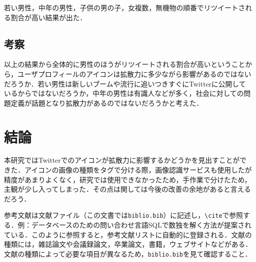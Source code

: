 若い男性，中年の男性，子供の男の子，女複数，無機物の順番でリツイートされる割合が高い結果が出た．

\section{考察}

以上の結果から全体的に男性のほうがリツイートされる割合が高いということから，ユーザプロフィールのアイコンは拡散力に多少ながら影響があるのではないだろうか．若い男性は新しいブームや流行に追いつきすぐにTwitterに公開しているからではないだろうか，中年の男性は有識人などが多く，社会に対しての問題定義が話題となり拡散力があるのではないだろうかと考えた．


\chapter{結論}

本研究ではTwitterでのアイコンが拡散力に影響するかどうかを見出すことができた．アイコンの画像の種類をタグで分ける際，画像認識サービスも使用したが精度があまりよくなく，研究では使用できなかったため，手作業で分けたため，主観が少し入ってしまった．その点は関しては今後の改善の余地があると言えるだろう．

参考文献は文献ファイル（この文書では\verb|biblio.bib|）に記述し，\verb|\cite|で参照する．例：データベースのための問い合わせ言語SQLで数独を解く方法が提案されている\cite{yabuki2011}．このように参照すると，参考文献リストに自動的に登録される．文献の種類には，雑誌論文\cite{yabuki2011}や会議録論文\cite{yabuki2013}，卒業論文\cite{kubo2014}，書籍\cite{okumura2013}，ウェブサイト\cite{self}などがある．文献の種類によって必要な項目が異なるため，\verb|biblio.bib|を見て確認すること．



